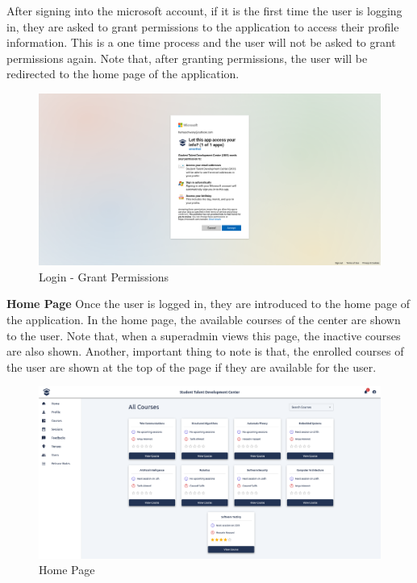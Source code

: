 \begin{justify}
    \vspace{0.25cm}
    \newendline After signing into the microsoft account, if it is the first time the user is logging in, they are asked to grant permissions to the application to access their profile information. This is a one time process and the user will not be asked to grant permissions again. Note that, after granting permissions, the user will be redirected to the home page of the application.

    \begin{figure}[H]
        \centerline{\includegraphics[width=150mm,scale=1]{figures/implementation_and_testing/implementation/frontend/pages/Login - Grant Permissions.png}}
        \caption{Login - Grant Permissions}
    \end{figure}



    \clearpage
    \noindent \textbf{Home Page}\newendline
    Once the user is logged in, they are introduced to the home page of the application. In the home page, the available courses of the center are shown to the user. Note that, when a superadmin views this page, the inactive courses are also shown. Another, important thing to note is that, the enrolled courses of the user are shown at the top of the page if they are available for the user.

    \begin{figure}[H]
        \centerline{\includegraphics[width=150mm,scale=1]{figures/implementation_and_testing/implementation/frontend/pages/Home page - Courses All.png}}
        \caption{Home Page}
    \end{figure}


\end{justify}
